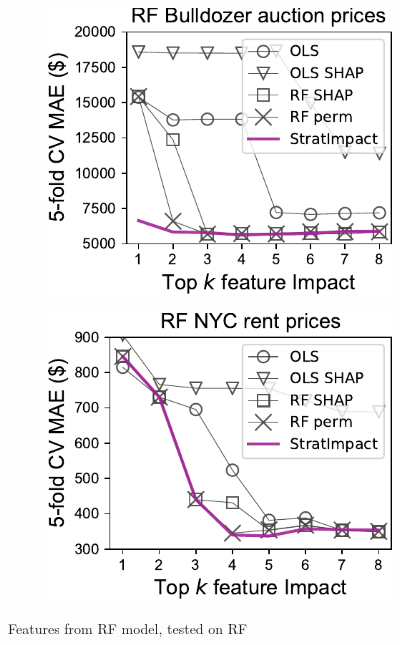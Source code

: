 \documentclass[twoside,11pt]{article}
\begin{document}
\begin{figure}
\hfill
\begin{subfigure}{.25\textwidth}
    \centering
\includegraphics[scale=0.5]{images/bulldozer-topk-RF-Impact.pdf}
\end{subfigure}%
\hfill
\begin{subfigure}{.2\textwidth}
    \centering
\includegraphics[scale=0.5]{images/rent-topk-RF-Impact.pdf}
\end{subfigure}
\caption[short]{Features from RF model, tested on RF}
\label{fig:topk-impact}
\end{figure}
\end{document}
